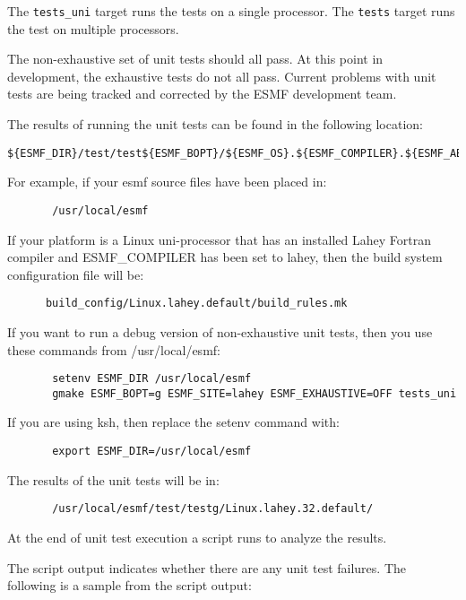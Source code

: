 The {\tt tests\_uni} target runs the tests on a single processor. 
The {\tt tests} target runs the test on multiple processors.

The non-exhaustive set of unit tests should all pass.  At this point in 
development, the exhaustive tests do not all pass.  Current problems with 
unit tests are being tracked and corrected by the ESMF development team.

The results of running the unit tests can be found in the following location:
\begin{verbatim}
${ESMF_DIR}/test/test${ESMF_BOPT}/${ESMF_OS}.${ESMF_COMPILER}.${ESMF_ABI}.${ESMF_SITE}
\end{verbatim}

For example, if your esmf source files have been placed in: 
\begin{verbatim}
       /usr/local/esmf
\end{verbatim}

If your platform is a Linux uni-processor that has an installed Lahey
Fortran compiler and ESMF\_COMPILER has been set to lahey, then the build
system configuration file will be:

\begin{verbatim}
      build_config/Linux.lahey.default/build_rules.mk
\end{verbatim}

If you want to run a debug version of non-exhaustive unit tests,
then you use these commands from /usr/local/esmf:

\begin{verbatim}
       setenv ESMF_DIR /usr/local/esmf
       gmake ESMF_BOPT=g ESMF_SITE=lahey ESMF_EXHAUSTIVE=OFF tests_uni
\end{verbatim}


If you are using ksh, then replace the setenv command with:
\begin{verbatim}
       export ESMF_DIR=/usr/local/esmf
\end{verbatim}

The results of the unit tests will be in:
\begin{verbatim}
       /usr/local/esmf/test/testg/Linux.lahey.32.default/
\end{verbatim}

At the end of unit test execution a script runs to analyze the results.

The script output indicates whether there are any unit test failures.
The following is a sample from the script output:

